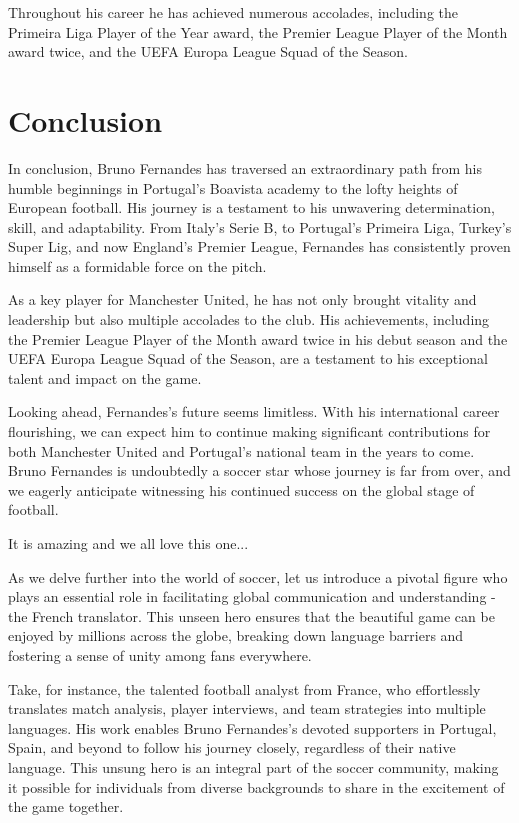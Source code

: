 \documentclass{article}
\begin{document}
Throughout his career he has achieved numerous accolades, including the Primeira Liga Player of the Year award, the Premier League Player of the Month award twice, and the UEFA Europa League Squad of the Season.

 \section*{Conclusion}

In conclusion, Bruno Fernandes has traversed an extraordinary path from his humble beginnings in Portugal's Boavista academy to the lofty heights of European football. His journey is a testament to his unwavering determination, skill, and adaptability. From Italy's Serie B, to Portugal's Primeira Liga, Turkey's Super Lig, and now England's Premier League, Fernandes has consistently proven himself as a formidable force on the pitch.

As a key player for Manchester United, he has not only brought vitality and leadership but also multiple accolades to the club. His achievements, including the Premier League Player of the Month award twice in his debut season and the UEFA Europa League Squad of the Season, are a testament to his exceptional talent and impact on the game.

Looking ahead, Fernandes's future seems limitless. With his international career flourishing, we can expect him to continue making significant contributions for both Manchester United and Portugal's national team in the years to come. Bruno Fernandes is undoubtedly a soccer star whose journey is far from over, and we eagerly anticipate witnessing his continued success on the global stage of football.

It is amazing and we all love this one...

 As we delve further into the world of soccer, let us introduce a pivotal figure who plays an essential role in facilitating global communication and understanding - the French translator. This unseen hero ensures that the beautiful game can be enjoyed by millions across the globe, breaking down language barriers and fostering a sense of unity among fans everywhere.

Take, for instance, the talented football analyst from France, who effortlessly translates match analysis, player interviews, and team strategies into multiple languages. His work enables Bruno Fernandes's devoted supporters in Portugal, Spain, and beyond to follow his journey closely, regardless of their native language. This unsung hero is an integral part of the soccer community, making it possible for individuals from diverse backgrounds to share in the excitement of the game together.
\end{document}
